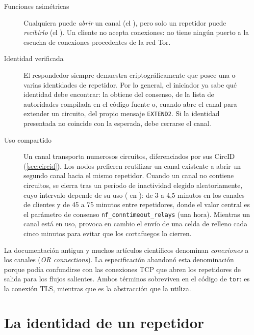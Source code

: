 \begin{description}
  \item[Funciones asimétricas] Cualquiera puede \emph{abrir} un canal (el ), pero solo un repetidor puede \emph{recibirlo} (el ). Un cliente no acepta conexiones: no tiene ningún puerto a la escucha de conexiones procedentes de la red Tor.
  \item[Identidad verificada] El respondedor siempre demuestra criptográficamente que posee una o varias identidades de repetidor. Por lo general, el iniciador ya sabe qué identidad debe encontrar: la obtiene del consenso, de la lista de autoridades compilada en el código fuente o, cuando abre el canal para extender un circuito, del propio mensaje \texttt{EXTEND2}. Si la identidad presentada no coincide con la esperada, debe cerrarse el canal.
  \item[Uso compartido] Un canal transporta numerosos circuitos, diferenciados por sus CircID (\cref{sec:circid}). Los nodos prefieren reutilizar un canal existente a abrir un segundo canal hacia el mismo repetidor. Cuando un canal no contiene circuitos, se cierra tras un período de inactividad elegido aleatoriamente, cuyo intervalo depende de su uso ( en ): de 3 a 4,5 minutos en los canales de clientes y de 45 a 75 minutos entre repetidores, donde el valor central es el parámetro de consenso \texttt{nf\_conntimeout\_relays} (una hora). Mientras un canal está en uso,  provoca en cambio el envío de una celda de relleno cada cinco minutos para evitar que los cortafuegos lo cierren.
\end{description}

\begin{approfondimento}
La documentación antigua y muchos artículos científicos denominan \emph{conexiones} a los canales (\emph{OR connections}). La especificación abandonó esta denominación porque podía confundirse con las conexiones TCP que abren los repetidores de salida para los flujos salientes. Ambos términos sobreviven en el código de \texttt{tor}:  es la conexión TLS, mientras que  es la abstracción que la utiliza.
\end{approfondimento}

\section{La identidad de un repetidor}\label{sec:canale-chiavi}


